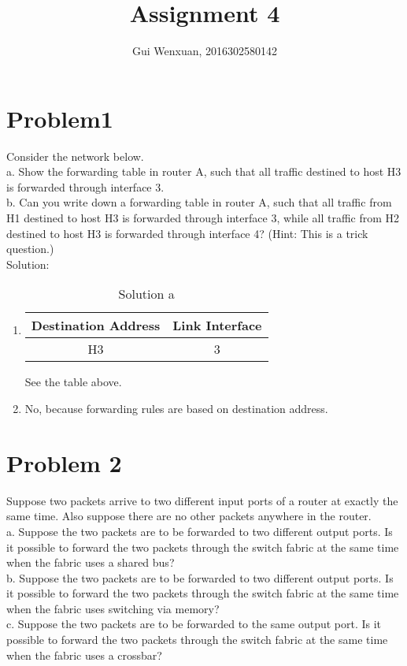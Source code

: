 \documentclass{article}
\author{Gui Wenxuan, 2016302580142}
\title{Assignment 4}
\begin{document}
   \maketitle
  
\newpage
\section{Problem1} Consider the network below.\\
a. Show the forwarding table in router A, such that all traffic destined to host H3 is forwarded through interface 3.\\
b. Can you write down a forwarding table in router A, such that all traffic from H1 destined to host H3 is forwarded through interface 3, while all traffic from H2 destined to host H3 is forwarded through interface 4? (Hint: This is a trick question.)\\


\noindent Solution:\\
\begin{enumerate}
\item
\begin{table}[htbp]
  \centering
  \begin{tabular}{@{} cc @{}}
    \hline
    {\bfseries Destination Address} & {\bfseries Link Interface} \\ 
    \hline
    H3 & 3 \\ 
    \hline
    \hline
  \end{tabular}
  \caption{Solution a}
  \label{tab:label}
\end{table}

See the table above.\\

\item No, because forwarding rules are based on destination address.
\end{enumerate}


\newpage
\section{Problem 2} Suppose two packets arrive to two different input ports of a router at exactly the same time. Also suppose there are no other packets anywhere in the router.\\ 
a. Suppose the two packets are to be forwarded to two different output ports. Is it possible to forward the two packets through the switch fabric at the same time when the fabric uses a shared bus?\\
b. Suppose the two packets are to be forwarded to two different output ports. Is it possible to forward the two packets through the switch fabric at the same time when the fabric uses switching via memory?\\
c. Suppose the two packets are to be forwarded to the same output port. Is it possible to forward the two packets through the switch fabric at the same time when the fabric uses a crossbar?\\
\end{document}
